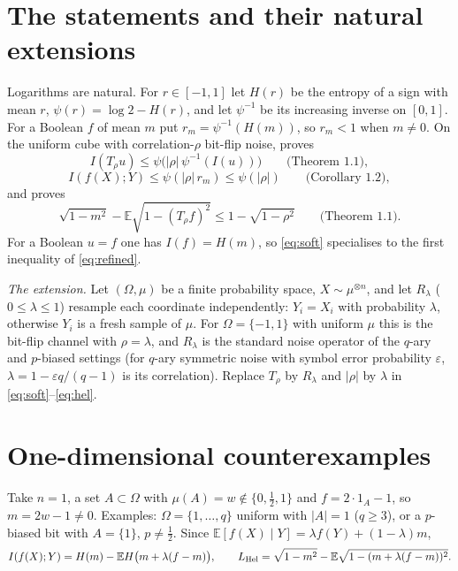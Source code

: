 \documentclass[11pt]{amsart}
\theoremstyle{remark}
\newcommand{\E}{\mathbb E}
\begin{document}
\section{The statements and their natural extensions}
Logarithms are natural. For $r\in[-1,1]$ let $H(r)$ be the entropy of a sign with mean $r$,
$\psi(r)=\log2-H(r)$, and let $\psi^{-1}$ be its increasing inverse on $[0,1]$. For a Boolean
$f$ of mean $m$ put $r_m=\psi^{-1}(H(m))$, so $r_m<1$ when $m\ne0$. On the uniform cube with
correlation-$\rho$ bit-flip noise, \cite{oai-ck} proves
\begin{equation}\label{eq:soft}
I(T_\rho u)\le\psi\bigl(|\rho|\,\psi^{-1}(I(u))\bigr)\qquad\text{(Theorem 1.1)},
\end{equation}
\begin{equation}\label{eq:refined}
I(f(X);Y)\le\psi(|\rho|\,r_m)\le\psi(|\rho|)\qquad\text{(Corollary 1.2)},
\end{equation}
and \cite{oai-hel} proves
\begin{equation}\label{eq:hel}
\sqrt{1-m^2}-\E\sqrt{1-(T_\rho f)^2}\le1-\sqrt{1-\rho^2}\qquad\text{(Theorem 1.1)}.
\end{equation}
For a Boolean $u=f$ one has $I(f)=H(m)$, so \eqref{eq:soft} specialises to the first inequality
of \eqref{eq:refined}.

\emph{The extension.} Let $(\Omega,\mu)$ be a finite probability space, $X\sim\mu^{\otimes n}$, and
let $R_\lambda$ ($0\le\lambda\le1$) resample each coordinate independently: $Y_i=X_i$ with
probability $\lambda$, otherwise $Y_i$ is a fresh sample of $\mu$. For $\Omega=\{-1,1\}$ with
uniform $\mu$ this is the bit-flip channel with $\rho=\lambda$, and $R_\lambda$ is the standard
noise operator of the $q$-ary and $p$-biased settings (for $q$-ary symmetric noise with symbol
error probability $\varepsilon$, $\lambda=1-\varepsilon q/(q-1)$ is its correlation). Replace
$T_\rho$ by $R_\lambda$ and $|\rho|$ by $\lambda$ in \eqref{eq:soft}--\eqref{eq:hel}.

\section{One-dimensional counterexamples}
Take $n=1$, a set $A\subset\Omega$ with $\mu(A)=w\notin\{0,\tfrac12,1\}$ and $f=2\cdot1_A-1$, so
$m=2w-1\ne0$. Examples: $\Omega=\{1,\dots,q\}$ uniform with $|A|=1$ ($q\ge3$), or a $p$-biased bit
with $A=\{1\}$, $p\ne\frac12$. Since $\E[f(X)\mid Y]=\lambda f(Y)+(1-\lambda)m$,
\[
I(f(X);Y)=H(m)-\E H\bigl(m+\lambda(f-m)\bigr),\qquad
L_{\rm Hel}=\sqrt{1-m^2}-\E\sqrt{1-(m+\lambda(f-m))^2}.
\]
\end{document}
